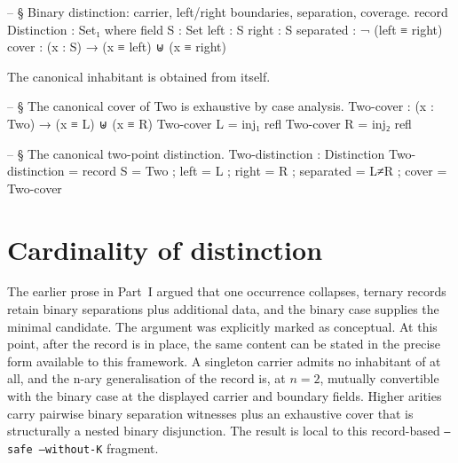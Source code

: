 \documentclass[11pt]{article}
\begin{document}
\begin{code}
-- § Binary distinction: carrier, left/right boundaries, separation, coverage.
record Distinction : Set₁ where
  field
    S         : Set
    left      : S
    right     : S
    separated : ¬ (left ≡ right)
    cover     : (x : S) → (x ≡ left) ⊎ (x ≡ right)
\end{code}

\begin{center}
\end{center}

The canonical inhabitant is obtained from  itself.

\begin{code}
-- § The canonical cover of Two is exhaustive by case analysis.
Two-cover : (x : Two) → (x ≡ L) ⊎ (x ≡ R)
Two-cover L = inj₁ refl
Two-cover R = inj₂ refl

-- § The canonical two-point distinction.
Two-distinction : Distinction
Two-distinction = record
  { S         = Two
  ; left      = L
  ; right     = R
  ; separated = L≠R
  ; cover     = Two-cover
  }
\end{code}

\section{Cardinality of distinction}

The earlier prose in Part~I argued that one occurrence collapses,
ternary records retain binary separations plus additional data, and the
binary case supplies the minimal candidate.  The argument was explicitly
marked as conceptual.  At this point, after the
 record is in place, the same content can be
stated in the precise form available to this framework.  A singleton
carrier admits no inhabitant of  at all, and
the n-ary generalisation of the record is, at $n=2$, mutually
convertible with the binary case at the displayed carrier and boundary
fields.  Higher arities carry pairwise binary separation witnesses plus
an exhaustive cover that is structurally a nested binary disjunction.
The result is local to this record-based \texttt{--safe --without-K}
fragment.
\end{document}
